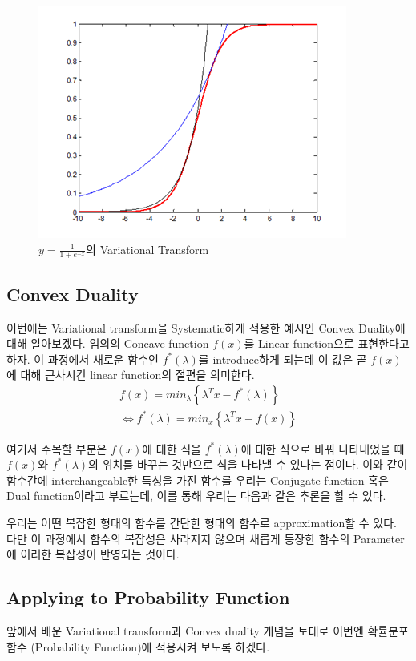 \documentclass[draft=false]{oblivoir}
\begin{document}
\begin{figure}[ht] \centering 
\includegraphics[scale=0.6]{fig11_2.png} 
\caption{ $y = \frac{1}{1+e^{-x}}$의 Variational Transform}
\label{fig:11-2}
\end{figure}
\newpage

\subsection{Convex Duality}
이번에는 Variational transform을 Systematic하게 적용한 예시인 Convex Duality에 대해 알아보겠다. 임의의 Concave function $f(x)$를 Linear function으로 표현한다고 하자. 이 과정에서 새로운 함수인 $f^{*}(\lambda)$를 introduce하게 되는데 이 값은 곧 $f(x)$에 대해 근사시킨 linear function의 절편을 의미한다.  
\begin{eqnarray}
f(x) = min_{\lambda}\left\{ \lambda^{T} x - f^{*}(\lambda)\right\}\nonumber\\
 \Leftrightarrow f^{*}( \lambda )=min_{x}\left\{ \lambda^{T}x - f(x)\right\}
\label{eq:11-2-5}
\end{eqnarray}

여기서 주목할 부분은 $f(x)$에 대한 식을 $f^{*}(\lambda)$에 대한 식으로 바꿔 나타내었을 때 $f(x)$와 $f^{*}(\lambda)$의 위치를 바꾸는 것만으로 식을 나타낼 수 있다는 점이다. 이와 같이 함수간에 interchangeable한 특성을 가진 함수를 우리는 Conjugate function 혹은 Dual function이라고 부르는데, 이를 통해 우리는 다음과 같은 추론을 할 수 있다. 

우리는 어떤 복잡한 형태의 함수를 간단한 형태의 함수로 approximation할 수 있다. 다만 이 과정에서 함수의 복잡성은 사라지지 않으며 새롭게 등장한 함수의 Parameter에 이러한 복잡성이 반영되는 것이다.

\subsection{Applying to Probability Function}
앞에서 배운 Variational transform과 Convex duality 개념을 토대로 이번엔 확률분포함수 (Probability Function)에 적용시켜 보도록 하겠다. 
\end{document}
